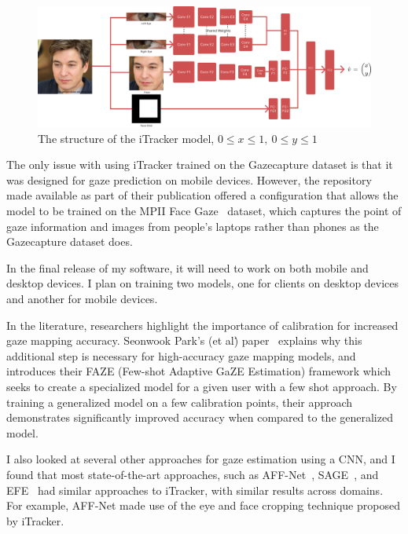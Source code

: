 \documentclass{report}
\begin{document}
\begin{figure}[h]
    \begin{center}
        \includegraphics[scale=0.07]{../assets/itracker-model-my-own.png}
    \end{center}
    \caption{The structure of the iTracker model, \(0\leq x \leq 1,~0 \leq y \leq 1\)}
    \label{fig:itracker-model}
\end{figure}

The only issue with using iTracker trained on the Gazecapture dataset is that it was designed for gaze prediction on mobile devices. However, the repository~\cite{krafka2016eye,cheng2021survey} made available as part of their publication offered a configuration that allows the model to be trained on the MPII Face Gaze~\cite{zhang2019mpii} dataset, which captures the point of gaze information and images from people's laptops rather than phones as the Gazecapture dataset does.

In the final release of my software, it will need to work on both mobile and desktop devices. I plan on training two models, one for clients on desktop devices and another for mobile devices.

In the literature, researchers highlight the importance of calibration for increased gaze mapping accuracy. Seonwook Park's (et al\.) paper~\cite{seonwook2019fewshot} explains why this additional step is necessary for high-accuracy gaze mapping models, and introduces their FAZE (Few-shot Adaptive GaZE Estimation) framework which seeks to create a specialized model for a given user with a few shot approach. By training a generalized model on a few calibration points, their approach demonstrates significantly improved accuracy when compared to the generalized model. 

I also looked at several other approaches for gaze estimation using a CNN, and I found that most state-of-the-art approaches, such as AFF-Net~\cite{bao2021adaptive}, SAGE~\cite{junfeng2019on}, and EFE~\cite{balim2023efe} had similar approaches to iTracker, with similar results across domains. For example, AFF-Net made use of the eye and face cropping technique proposed by iTracker. 
\end{document}
